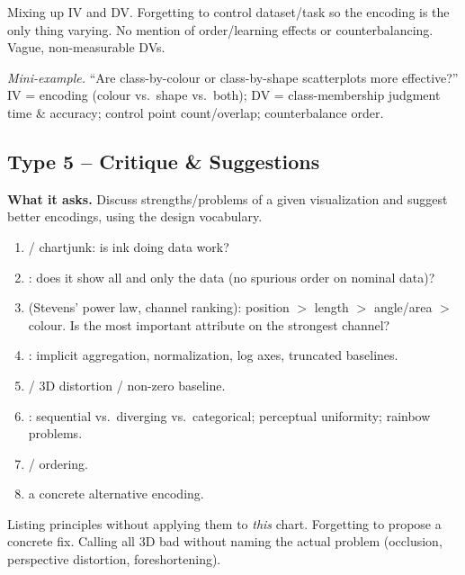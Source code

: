 \begin{pitfall}
Mixing up IV and DV. Forgetting to control dataset/task so the encoding is the
only thing varying. No mention of order/learning effects or counterbalancing.
Vague, non-measurable DVs.
\end{pitfall}

\textit{Mini-example.} ``Are class-by-colour or class-by-shape scatterplots more
effective?'' IV = encoding (colour vs.\ shape vs.\ both); DV = class-membership
judgment time \& accuracy; control point count/overlap; counterbalance order.

\subsection{Type 5 -- Critique \& Suggestions}

\textbf{What it asks.} Discuss strengths/problems of a given visualization and
suggest better encodings, using the design vocabulary.

\begin{exambox}
\begin{enumerate}[leftmargin=1.4em]
  \item {} / chartjunk: is ink doing data work?
  \item {}: does it show all and only the data
        (no spurious order on nominal data)?
  \item {} (Stevens' power law, channel ranking):
        position $>$ length $>$ angle/area $>$ colour. Is the most important
        attribute on the strongest channel?
  \item {}: implicit aggregation, normalization,
        log axes, truncated baselines.
  \item {} / 3D distortion / non-zero baseline.
  \item {}: sequential vs.\ diverging vs.\ categorical;
        perceptual uniformity; rainbow problems.
  \item {} / ordering.
  \item {} a concrete alternative encoding.
\end{enumerate}
\end{exambox}

\begin{pitfall}
Listing principles without applying them to \emph{this} chart. Forgetting to
propose a concrete fix. Calling all 3D bad without naming the actual problem
(occlusion, perspective distortion, foreshortening).
\end{pitfall}

